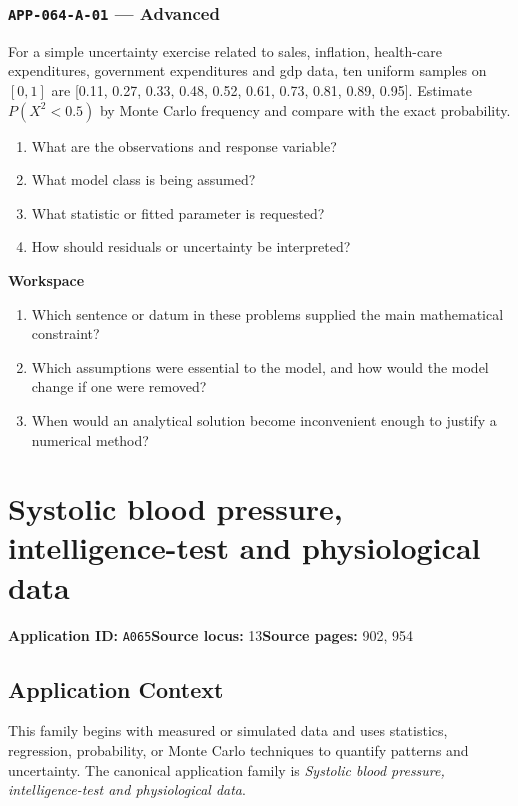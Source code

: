 \documentclass[11pt]{book}
\newcommand{\pid}[1]{\texttt{#1}}
\newcommand{\workspace}{\par\vspace{0.7in}\hrulefill\par\vspace{0.55in}\hrulefill\par}
\begin{document}
\subsection*{\pid{APP-064-A-01} — Advanced}
\begin{problembox}
For a simple uncertainty exercise related to sales, inflation, health-care expenditures, government expenditures and gdp data, ten uniform samples on $[0,1]$ are [0.11, 0.27, 0.33, 0.48, 0.52, 0.61, 0.73, 0.81, 0.89, 0.95]. Estimate $P(X^2<0.5)$ by Monte Carlo frequency and compare with the exact probability.
\end{problembox}
\begin{promptbox}\begin{enumerate}
\item What are the observations and response variable?
\item What model class is being assumed?
\item What statistic or fitted parameter is requested?
\item How should residuals or uncertainty be interpreted?
\end{enumerate}\end{promptbox}
\textbf{Workspace}\workspace
\begin{reflectionbox}\begin{enumerate}
\item Which sentence or datum in these problems supplied the main mathematical constraint?
\item Which assumptions were essential to the model, and how would the model change if one were removed?
\item When would an analytical solution become inconvenient enough to justify a numerical method?
\end{enumerate}\end{reflectionbox}
\chapter{Systolic blood pressure, intelligence-test and physiological data}\label{app:A065}
\textbf{Application ID:} \pid{A065}\quad \textbf{Source locus:} 13\quad \textbf{Source pages:} 902, 954
\section*{Application Context}
This family begins with measured or simulated data and uses statistics, regression, probability, or Monte Carlo techniques to quantify patterns and uncertainty. The canonical application family is \emph{Systolic blood pressure, intelligence-test and physiological data}.
\end{document}
